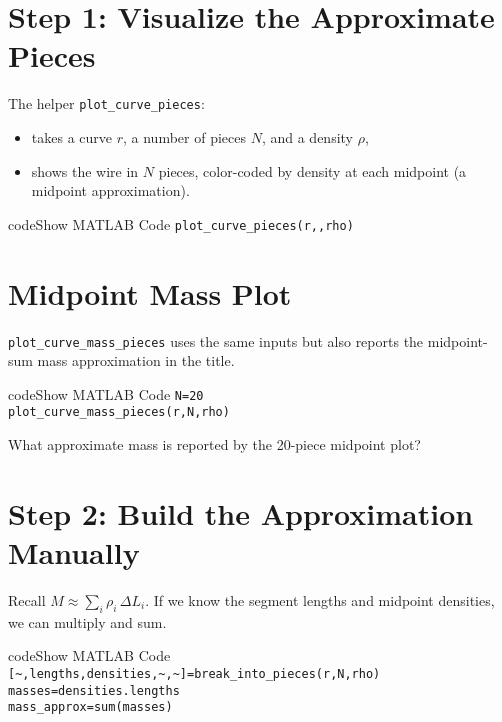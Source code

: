 \documentclass{ximera}
\begin{document}
\section*{Step 1: Visualize the Approximate Pieces}

The helper \texttt{plot\_curve\_pieces}:
\begin{itemize}
\item takes a curve \(r\), a number of pieces \(N\), and a density \(\rho\),
\item shows the wire in \(N\) pieces, color-coded by density at each midpoint (a midpoint approximation).
\end{itemize}

\begin{expandable}{code}{Show MATLAB Code}
\texttt{plot\_curve\_pieces(r,,\;rho)}
\end{expandable}

\section*{Midpoint Mass Plot}

\texttt{plot\_curve\_mass\_pieces} uses the same inputs but also reports the midpoint-sum mass approximation in the title.

\begin{expandable}{code}{Show MATLAB Code}
\texttt{N=20}\\
\texttt{plot\_curve\_mass\_pieces(r,\;N,\;rho)}
\end{expandable}

\begin{problem}
What approximate mass is reported by the 20-piece midpoint plot? 
\end{problem}

\section*{Step 2: Build the Approximation Manually}

Recall $M \approx \sum_i \rho_i\,\Delta L_i$. If we know the segment lengths and midpoint densities, we can multiply and sum.

\begin{expandable}{code}{Show MATLAB Code}
\texttt{[\textasciitilde,\;lengths,\;densities,\;\textasciitilde,\;\textasciitilde]\;=\;break\_into\_pieces(r,\;N,\;rho)}\\
\texttt{masses\;=\;densities\;.\*\;lengths}\\
\texttt{mass\_approx\;=\;sum(masses)}
\end{expandable}
\end{document}
